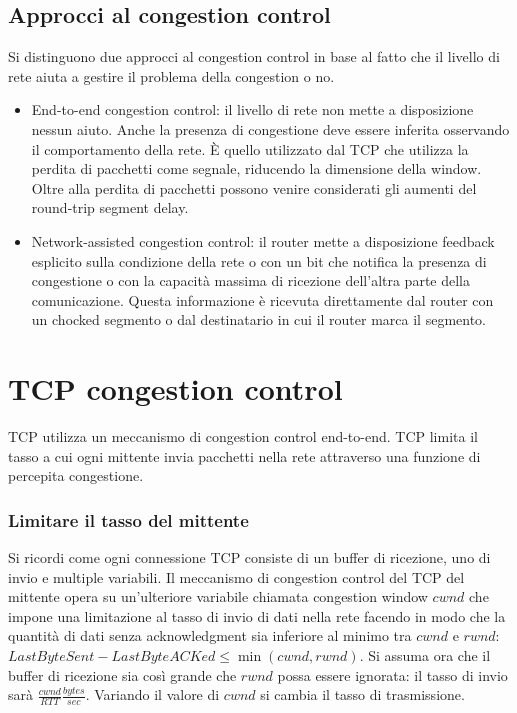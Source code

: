 \subsection{Approcci al congestion control}
Si distinguono due approcci al congestion control in base al fatto che il livello di rete aiuta a gestire il problema della congestion o no.
\begin{itemize}
\item End-to-end congestion control: il livello di rete non mette a disposizione nessun aiuto. Anche la presenza di congestione deve essere inferita 
osservando il comportamento della rete. \`E quello utilizzato dal TCP che utilizza la perdita di pacchetti come segnale, riducendo la dimensione della 
window. Oltre alla perdita di pacchetti possono venire considerati gli aumenti del round-trip segment delay. 
\item Network-assisted congestion control: il router mette a disposizione feedback esplicito sulla condizione della rete o con un bit che notifica la 
presenza di congestione o con la capacit\`a massima di ricezione dell'altra parte della comunicazione. Questa informazione \`e ricevuta direttamente dal 
router con un chocked segmento o dal destinatario in cui il router marca il segmento. 
\end{itemize}
\section{TCP congestion control}
TCP utilizza un meccanismo di congestion control end-to-end. TCP limita il tasso a cui ogni mittente invia pacchetti nella rete attraverso una funzione
di percepita congestione.
\subsubsection{Limitare il tasso del mittente}
Si ricordi come ogni connessione TCP consiste di un buffer di ricezione, uno di invio e multiple variabili. Il meccanismo di congestion control del TCP del
mittente opera su un'ulteriore variabile chiamata congestion window $cwnd$ che impone una limitazione al tasso di invio di dati nella rete facendo in modo
che la quantit\`a di dati senza acknowledgment sia inferiore al minimo tra $cwnd$ e $rwnd$: $LastByteSent-LastByteACKed\le\min(cwnd, rwnd)$. Si assuma ora
che il buffer di ricezione sia cos\`i grande che $rwnd$ possa essere ignorata: il tasso di invio sar\`a $\frac{cwnd}{RTT}\frac{bytes}{sec}$. Variando il
valore di $cwnd$ si cambia il tasso di trasmissione. 
